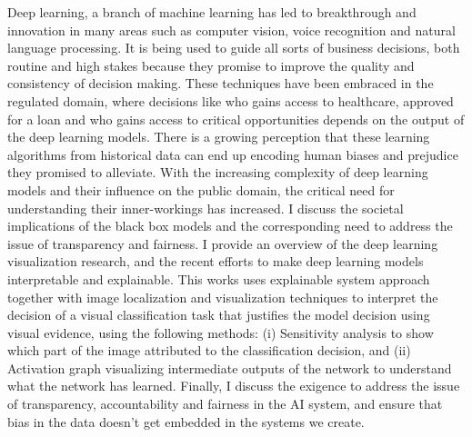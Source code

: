 %
%
%

\begin{publicabstract}

Deep learning, a branch of machine learning has led to breakthrough and innovation in many areas such as computer vision, voice recognition and natural language processing. It is being used to guide all sorts of business decisions, both routine and high stakes because they promise to improve the quality and consistency of decision making. These techniques have been embraced in the regulated domain, where decisions like who gains access to healthcare, approved for a loan and who gains access to critical opportunities depends on the output of the deep learning models. There is a growing perception that these learning algorithms from historical data can end up encoding human biases and prejudice they promised to alleviate. With the increasing complexity of deep learning models and their influence on the public domain, the critical need for understanding their inner-workings has increased. I discuss the societal implications of the black box models and the corresponding need to address the issue of transparency and fairness. I provide an overview of the deep learning visualization research, and the recent efforts to make deep learning models interpretable and explainable. This works uses explainable system approach together with image localization and visualization techniques to interpret the decision of a visual classification task that justifies the model decision using visual evidence, using the following methods: (i) Sensitivity analysis to show which part of the image attributed to the classification decision, and (ii) Activation graph visualizing intermediate outputs of the network to understand what the network has learned. Finally, I discuss the exigence to address the issue of transparency, accountability and fairness in the AI system, and ensure that bias in the data doesn't get embedded in the systems we create.


\end{publicabstract}


